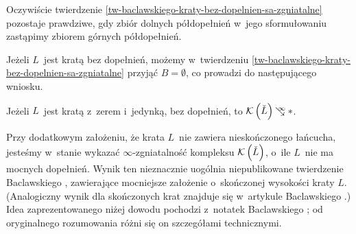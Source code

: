 Oczywiście twierdzenie \ref{tw-baclawskiego-kraty-bez-dopelnien-sa-zgniatalne} pozostaje prawdziwe, gdy zbiór dolnych półdopełnień w~jego sformułowaniu zastąpimy zbiorem górnych półdopełnień.

Jeżeli $L$~jest kratą bez dopełnień, możemy w~twierdzeniu \ref{tw-baclawskiego-kraty-bez-dopelnien-sa-zgniatalne} przyjąć $B=\emptyset$, co prowadzi do następującego wniosku.

\begin{wn}\label{wn-baclawskiego-o-kratach-bez-dopelnien}
Jeżeli $L$~jest kratą z~zerem i~jedynką, bez dopełnień, to $\mK\left(\check{L}\right)\!\infcoll *$.
\end{wn}

Przy dodatkowym założeniu, że krata $L$~nie zawiera nieskończonego łańcucha, jesteśmy w~stanie wykazać $\infty$-zgniatalność kompleksu $\mathcal{K}\left(\check{L}\right)$, o~ile $L$~nie ma mocnych dopełnień. Wynik ten nieznacznie uogólnia niepublikowane twierdzenie Baclawskiego \cite[Theorem 9.2]{Baclawski}, zawierające mocniejsze założenie o~skończonej wysokości kraty $L$. (Analogiczny wynik dla skończonych krat znajduje się w~artykule Baclawskiego \cite[Theorem 27]{Baclawski12}.) Idea zaprezentowanego niżej dowodu pochodzi z~notatek Baclawskiego \cite{Baclawski}; od oryginalnego rozumowania różni się on szczegółami technicznymi. 

